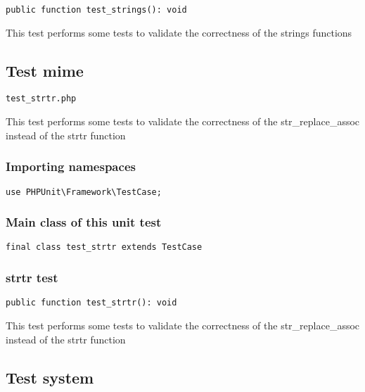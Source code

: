 \documentclass[a4paper]{article}
\begin{document}
\begin{lstlisting}
public function test_strings(): void
\end{lstlisting}

This test performs some tests to validate the correctness
of the strings functions

\hypertarget{toc342}{}
\subsection{Test mime}

\begin{lstlisting}
test_strtr.php
\end{lstlisting}

This test performs some tests to validate the correctness
of the str\_replace\_assoc instead of the strtr function

\hypertarget{toc343}{}
\subsubsection{Importing namespaces}

\begin{lstlisting}
use PHPUnit\Framework\TestCase;
\end{lstlisting}

\hypertarget{toc344}{}
\subsubsection{Main class of this unit test}

\begin{lstlisting}
final class test_strtr extends TestCase
\end{lstlisting}

\hypertarget{toc345}{}
\subsubsection{strtr test}

\begin{lstlisting}
public function test_strtr(): void
\end{lstlisting}

This test performs some tests to validate the correctness
of the str\_replace\_assoc instead of the strtr function

\hypertarget{toc346}{}
\subsection{Test system}
\end{document}
